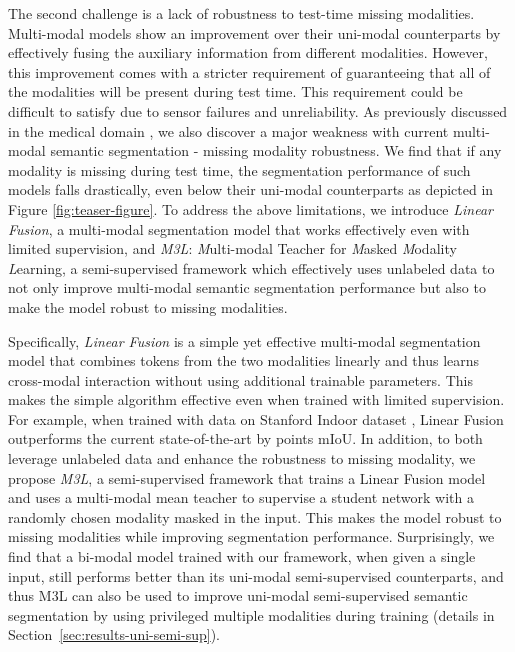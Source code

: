 \documentclass[10pt,twocolumn,letterpaper]{article}
\begin{document}
The second challenge is a lack of robustness to test-time missing modalities.  
Multi-modal models show an improvement over their uni-modal counterparts by effectively fusing the auxiliary information from different modalities. However, this improvement comes with a stricter requirement of guaranteeing that all of the modalities will be present during test time. This requirement could be difficult to satisfy due to sensor failures and unreliability. As previously discussed in the medical domain \cite{shen2019brain, urn, dorent2019hetero}, we also discover a major weakness with current multi-modal semantic segmentation - missing modality robustness. We find that if any modality is missing during test time, the segmentation performance of such models falls drastically, even below their uni-modal counterparts as depicted in Figure \ref{fig:teaser-figure}. 
To address the above limitations, we introduce \emph{Linear Fusion}, a multi-modal segmentation model that works effectively even with limited supervision, and \emph{M3L}: \emph{M}ulti-modal Teacher for \emph{M}asked \emph{M}odality \emph{L}earning, a semi-supervised framework which effectively uses unlabeled data to not only improve multi-modal semantic segmentation performance but also to make the model robust to missing modalities.

Specifically, \emph{Linear Fusion} is a simple yet effective multi-modal segmentation model that combines tokens from the two modalities linearly and thus learns cross-modal interaction without using additional trainable parameters. This makes the simple algorithm effective even when trained with limited supervision. 
For example, when trained with  data on Stanford Indoor dataset \cite{stanfordindoor}, Linear Fusion outperforms the current state-of-the-art by  points mIoU. In addition, to both leverage unlabeled data and enhance the robustness to missing modality, we propose \emph{M3L}, a semi-supervised framework that trains a Linear Fusion model and uses a multi-modal mean teacher to supervise a student network with a randomly chosen modality masked in the input. This makes the model robust to missing modalities while improving segmentation performance. Surprisingly, we find that a bi-modal model trained with our framework, when given a single input, still performs better than its uni-modal semi-supervised counterparts, and thus M3L can also be used to improve uni-modal semi-supervised semantic segmentation by using privileged multiple modalities during training (details in Section~\ref{sec:results-uni-semi-sup}). 
\end{document}
